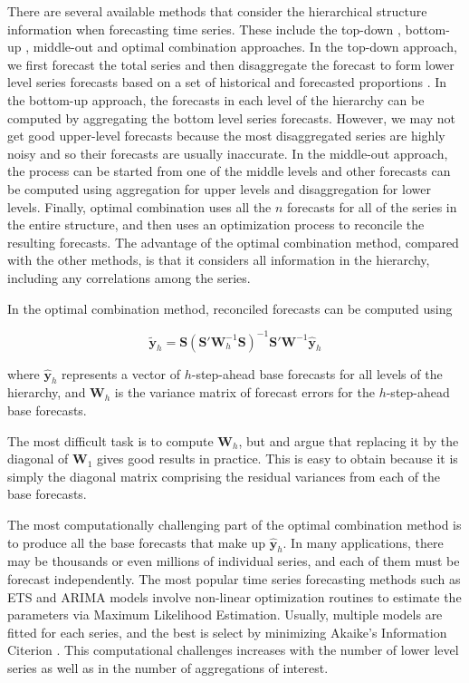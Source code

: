 \documentclass[11pt,a4paper,]{article}
\begin{document}
There are several available methods that consider the hierarchical
structure information when forecasting time series. These include the
top-down \autocites{gross1990disaggregation}{fliedner2001hierarchical},
bottom-up \autocite{kahn1998revisiting}, middle-out and optimal
combination \autocite{hyndman2011optimal} approaches. In the top-down
approach, we first forecast the total series and then disaggregate the
forecast to form lower level series forecasts based on a set of
historical and forecasted proportions \autocite[for details
see][]{athanasopoulos2009hierarchical}. In the bottom-up approach, the
forecasts in each level of the hierarchy can be computed by aggregating
the bottom level series forecasts. However, we may not get good
upper-level forecasts because the most disaggregated series are highly
noisy and so their forecasts are usually inaccurate. In the middle-out
approach, the process can be started from one of the middle levels and
other forecasts can be computed using aggregation for upper levels and
disaggregation for lower levels. Finally, optimal combination uses all
the \(n\) forecasts for all of the series in the entire structure, and
then uses an optimization process to reconcile the resulting forecasts.
The advantage of the optimal combination method, compared with the other
methods, is that it considers all information in the hierarchy,
including any correlations among the series.

In the optimal combination method, reconciled forecasts can be computed
using \autocite{mint2018}

\begin{equation}\label{eq:mint}
  \tilde{\bm{y}}_{h}=\bm{S}(\bm{S}'\bm{W}_h^{-1}\bm{S})^{-1}\bm{S}'\bm{W}^{-1}\hat{\bm{y}}_h
\end{equation}

where \(\hat{\bm{y}}_h\) represents a vector of \(h\)-step-ahead base
forecasts for all levels of the hierarchy, and \(\bm{W}_h\) is the
variance matrix of forecast errors for the \(h\)-step-ahead base
forecasts.

The most difficult task is to compute \(\bm{W}_h\), but
\textcite{mint2018} and \textcite{hyndman2016fast} argue that replacing
it by the diagonal of \(\bm{W}_1\) gives good results in practice. This
is easy to obtain because it is simply the diagonal matrix comprising
the residual variances from each of the base forecasts.

The most computationally challenging part of the optimal combination
method is to produce all the base forecasts that make up
\(\hat{\bm{y}}_h\). In many applications, there may be thousands or even
millions of individual series, and each of them must be forecast
independently. The most popular time series forecasting methods such as
ETS and ARIMA models \autocite{fpp2} involve non-linear optimization
routines to estimate the parameters via Maximum Likelihood Estimation.
Usually, multiple models are fitted for each series, and the best is
select by minimizing Akaike's Information Citerion
\autocite{akaike1998information}. This computational challenges
increases with the number of lower level series as well as in the number
of aggregations of interest.
\end{document}
